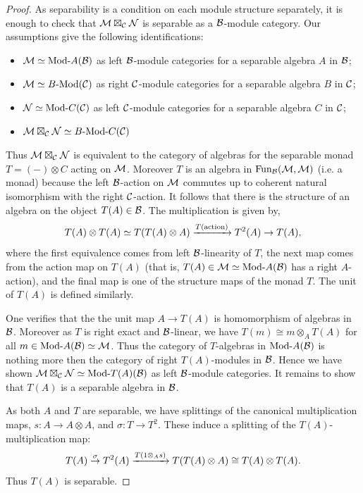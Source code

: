 \documentclass{amsart}
\begin{document}
\begin{proof}
	As separability is a condition on each module structure separately, it is enough to check that $\mathcal M \boxtimes_{\mathcal C} \mathcal N$ is separable as a $\mathcal B$-module category. Our assumptions give the following identifications:
\begin{itemize}
	\item $\cM \simeq \Mod{}{A}(\cB)$ as left $\mathcal B$-module categories for a separable algebra $A$ in $\mathcal B$;
	\item $\cM \simeq \Mod{B}{}(\cC)$ as right $\mathcal C$-module categories for a separable algebra $B$ in $\mathcal C$;
	\item $\cN \simeq \Mod{}{C}(\cC)$ as left $\mathcal C$-module categories for a separable algebra $C$ in $\mathcal C$;
	\item $\cM \boxtimes_{\cC} \cN \simeq \Mod{B}{C}(\cC)$
\end{itemize}
Thus $\mathcal M \boxtimes_{\mathcal C} \mathcal N$ is equivalent to the category of algebras for the separable monad $T = (-) \otimes C$ acting on $\mathcal M$. Moreover $T$ is an algebra in $\operatorname{Fun}_{\mathcal B}(\mathcal M, \mathcal M)$ (i.e. a monad) because the left $\mathcal B$-action on $\mathcal M$ commutes up to coherent natural isomorphism with the right $\mathcal C$-action.  It follows that there is the structure of an algebra on the object $T(A) \in \mathcal B$. The multiplication is given by,
\begin{equation*}
	T(A) \otimes T(A)  \simeq T( T(A) \otimes A)  \xrightarrow{T(\textrm{action})} T^2(A) \to T(A),
\end{equation*}
where the first equivalence comes from left $\mathcal B$-linearity of $T$, the next map comes from the action map on $T(A)$ (that is, $T(A) \in \cM \simeq \Mod{}{A}(\cB)$ has a right $A$-action), and the final map is one of the structure maps of the monad $T$. The unit of $T(A)$ is defined similarly. 

One verifies that the the unit map $A \to T(A)$ is homomorphism of algebras in $\mathcal B$. Moreover as $T$ is right exact and $\mathcal B$-linear, we have $T(m) \cong m \otimes_A T(A)$ for all $m \in \Mod{}{A}(\cB) \simeq \cM$. Thus the category of $T$-algebras in $\Mod{}{A}(\cB)$ is nothing more then the category of right $T(A)$-modules in $\mathcal B$.  Hence we have shown $\cM \boxtimes_{\cC} \cN \simeq \Mod{}{T(A)}(\cB)$ as left $\mathcal B$-module categories. It remains to show that $T(A)$ is a separable algebra in $\mathcal B$.

As both $A$ and $T$ are separable, we have splittings of the canonical multiplication maps, $s: A  \to A \otimes A$, and $\sigma:T \to T^2$. These induce a splitting of the $T(A)$-multiplication map:
\begin{equation*}
	T(A) \stackrel{\sigma}{\to} T^2(A) \xrightarrow{T(1 \otimes_A s)} T( T(A) \otimes A) \cong T(A) \otimes T(A).
\end{equation*}
Thus $T(A)$ is separable.
\end{proof}
\end{document}
